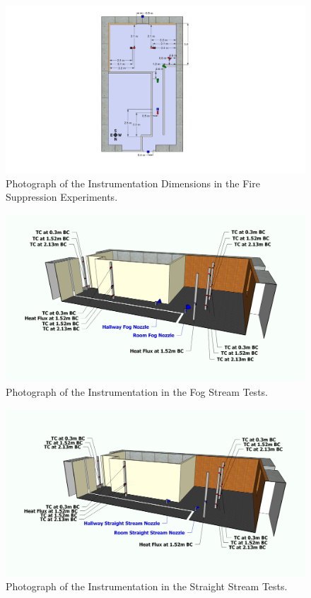 \documentclass[12pt,oneside]{book}
\begin{document}
\begin{figure}[!ht]
	\includegraphics[width=6in]{../Figures/Pictures/DelCoSingleStoryInstrumentationDimensions}
	\caption{Photograph of the Instrumentation Dimensions in the Fire Suppression Experiments.}
	\label{fig:Fire_Suppression_Instrumentation_Dimensions}
\end{figure}

\begin{figure}[!ht]
	\includegraphics[width=6in]{../Figures/Pictures/Fog_Instrumentation}
	\caption{Photograph of the Instrumentation in the Fog Stream Tests.}
	\label{fig:Fog_Instrumentation}
\end{figure}

\begin{figure}[!ht]
	\includegraphics[width=6in]{../Figures/Pictures/Straight_Stream_Instrumentation}
	\caption{Photograph of the Instrumentation in the Straight Stream Tests.}
	\label{fig:Straigh_Stream_Instrumentation}
\end{figure}
\end{document}

